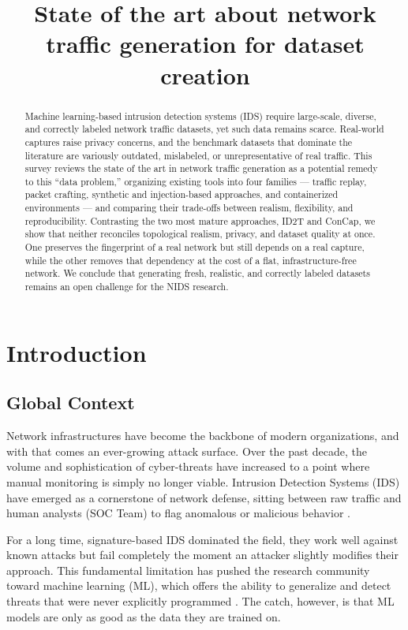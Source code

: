 \documentclass[conference]{IEEEtran}
\title{State of the art about network traffic generation for dataset creation}
\author{
\IEEEauthorblockN{Evan JOASSON \\ July 2026}
}
\begin{document}
\maketitle

\begin{abstract}
Machine learning-based intrusion detection systems (IDS) require
large-scale, diverse, and correctly labeled network traffic datasets,
yet such data remains scarce. Real-world captures raise privacy
concerns, and the benchmark datasets that dominate the literature are
variously outdated, mislabeled, or unrepresentative of real traffic.
This survey reviews the state of the art in network traffic generation
as a potential remedy to this ``data problem,'' organizing existing
tools into four families --- traffic replay, packet crafting, synthetic
and injection-based approaches, and containerized environments --- and
comparing their trade-offs between realism, flexibility, and
reproducibility. Contrasting the two most mature approaches, ID2T and
ConCap, we show that neither reconciles topological realism, privacy,
and dataset quality at once. One preserves the fingerprint of a real
network but still depends on a real capture, while the other removes
that dependency at the cost of a flat, infrastructure-free network. We
conclude that generating fresh, realistic, and correctly labeled
datasets remains an open challenge for the NIDS research.
\end{abstract}

\section{Introduction}

\subsection{Global Context}

Network infrastructures have become the backbone of modern organizations,
and with that comes an ever-growing attack surface. Over the past decade,
the volume and sophistication of cyber-threats have increased to a point
where manual monitoring is simply no longer viable. Intrusion Detection
Systems (IDS) have emerged as a cornerstone of network defense, sitting
between raw traffic and human analysts (SOC Team) to flag anomalous or malicious
behavior \cite{sharafaldin2018}.

For a long time, signature-based IDS dominated the field, they work well
against known attacks but fail completely the moment an attacker slightly
modifies their approach. This fundamental limitation has pushed the research
community toward machine learning (ML), which offers the ability to generalize
and detect threats that were never explicitly programmed \cite{survey2026}.
The catch, however, is that ML models are only as good as the data they
are trained on.
\end{document}
